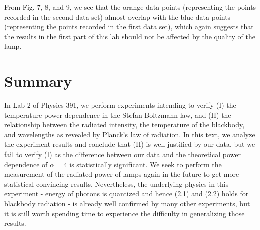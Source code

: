 \documentclass[11pt]{book}
\theoremstyle{break}
\theoremstyle{break}
\begin{document}
From Fig. 7, 8, and 9, we see that the orange data points (representing the points recorded in the second data set) almost overlap with the blue data points (representing the points recorded in the first data set), which again suggests that the results in the first part of this lab should not be affected by the quality of the lamp.



\hfill\break
\hfill\break
\section{Summary}
In Lab 2 of Physics 391, we perform experiments intending to verify (I) the temperature power dependence in the Stefan-Boltzmann law, and (II) the relationship between the radiated intensity, the temperature of the blackbody, and wavelengths as revealed by Planck's law of radiation. In this text, we analyze the experiment results and conclude that (II) is well justified by our data, but we fail to verify (I) as the difference between our data and the theoretical power dependence of $\alpha = 4$ is statistically significant. We seek to perform the measurement of the radiated power of lamps again in the future to get more statistical convincing results. Nevertheless, the underlying physics in this experiment - energy of photons is quantized and hence (2.1) and (2.2) holds for blackbody radiation - is already well confirmed by many other experiments, but it is still worth spending time to experience the difficulty in generalizing those results.



\newpage
\end{document}
